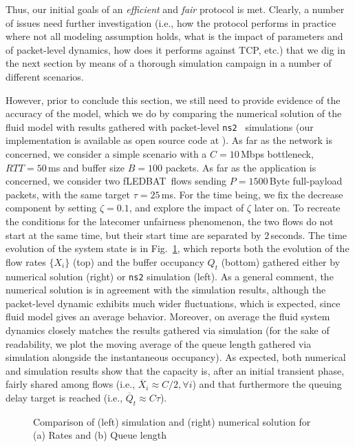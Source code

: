 \documentclass[conference]{IEEEtran}
\newcommand{\figR}[1]{Fig.~\ref{fig:#1}}
\newcommand{\figLC}[2]{
        \caption{#2}
        \label{fig:#1}
        \vspace{-5pt}
}
\newcommand{\fledbat}[0]{fLEDBAT}
\begin{document}
\noindent Thus, our initial goals of an \emph{efficient} and \emph{fair}
protocol is met. Clearly, a  number of issues need further investigation  (i.e., how the protocol performs in practice where not all modeling assumption holds, what is the impact of parameters and of packet-level dynamics, how does it performs against TCP, etc.) that we dig in the next section by means of a thorough simulation campaign in a number of different scenarios.

However, prior to conclude this section, we still need to provide evidence of the accuracy of the model, which we do by comparing the numerical solution of the fluid model with results gathered with packet-level \texttt{ns2}~\cite{ns2} simulations (our implementation is available as open source code at \cite{ledbat_code}). As far as the network is concerned, we consider a simple scenario with a  $C=10$\,Mbps bottleneck, $RTT=50$\,ms and buffer size $B=100$ packets. As far as the application is concerned, we consider two \fledbat\ flows sending $P=1500$\,Byte full-payload packets, with the same target $\tau=25$\,ms. For the time being, we fix the decrease component by setting $\zeta=0.1$, and explore the impact of $\zeta$ later on. To recreate the conditions for the latecomer unfairness phenomenon,
the two flows do not start at the same time, but their start time are separated by $2$\,seconds. The time evolution of the system state is in  \figR{comparison}, which reports both the evolution of the flow rates $\{X_i\}$ (top) and the buffer occupancy $Q_t$ (bottom) gathered either by numerical solution (right) or \texttt{ns2} simulation (left).  As a general comment, the numerical solution is in agreement with the simulation results, although the packet-level dynamic exhibits much wider fluctuations, which is expected, since fluid model gives an average behavior. Moreover, on average the fluid system dynamics closely matches the results gathered via simulation (for the sake of readability, we plot the moving average of the queue length gathered via simulation alongside the instantaneous occupancy).  As expected, both numerical and simulation results show that the capacity is, after an initial transient phase, fairly shared among flows (i.e., $\overline{X}_i\approx C/2, \forall i$) and that furthermore the queuing delay target is reached (i.e., $\overline{Q}_t \approx C \tau$).

\begin{figure}[t]
    \begin{center}
        \figLC{comparison}{Comparison of (left) simulation and (right) numerical solution for (a) Rates and (b) Queue length}
    \end{center}
\end{figure}
\end{document}
